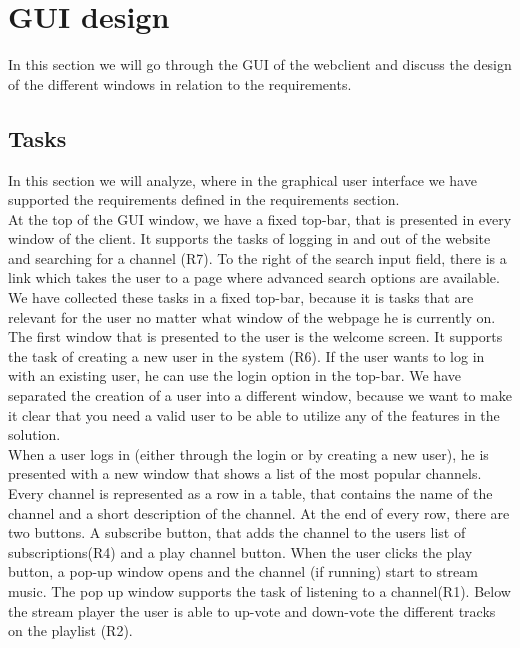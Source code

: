 \documentclass[a4paper,11pt,report]{article}
\begin{document}
\section{GUI design}
In this section we will go through the GUI of the webclient and discuss the design of the different windows in relation to the requirements.

\subsection{Tasks}
In this section we will analyze, where in the graphical user interface we have supported the requirements defined in the requirements section.\\

At the top of the GUI window, we have a fixed top-bar, that is presented in every window of the client. It supports the tasks of logging in and out of the website and searching for a channel (R7). To the right of the search input field, there is a link which takes the user to a page where advanced search options are available. We have collected these tasks in a fixed top-bar, because it is tasks that are relevant for the user no matter what window of the webpage he is currently on.\\

The first window that is presented to the user is the welcome screen. It supports the task of creating a new user in the system (R6). If the user wants to log in with an existing user, he can use the login option in the top-bar. We have separated the creation of a user into a different window, because we want to make it clear that you need a valid user to be able to utilize any of the features in the solution.\\

When a user logs in (either through the login or by creating a new user), he is presented with a new window that shows a list of the most popular channels. Every channel is represented as a row in a table, that contains the name of the channel and a short description of the channel. At the end of every row, there are two buttons. A subscribe button, that adds the channel to the users list of subscriptions(R4) and a play channel button. When the user clicks the play button, a pop-up window opens and the channel (if running) start to stream music. The pop up window supports the task of listening to a channel(R1). Below the stream player the user is able to up-vote and down-vote the different tracks on the playlist (R2).\\
\end{document}
